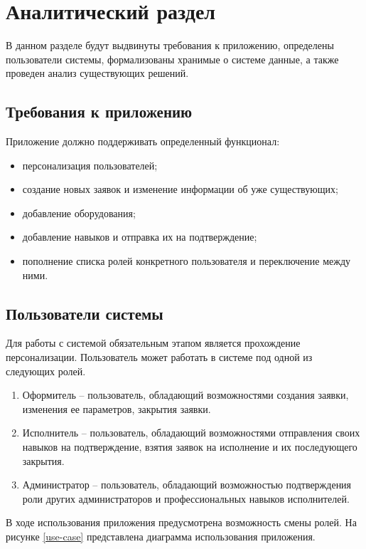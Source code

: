 \chapter{Аналитический раздел}

В данном разделе будут выдвинуты требования к приложению, определены пользователи системы, формализованы хранимые о системе данные, а также проведен анализ существующих решений.

\section{Требования к приложению}

Приложение должно поддерживать определенный функционал:
\begin{itemize}
	\item персонализация пользователей;
	\item создание новых заявок и изменение информации об уже существующих;
	\item добавление оборудования;
	\item добавление навыков и отправка их на подтверждение;
	\item пополнение списка ролей конкретного пользователя и переключение между ними.
\end{itemize}

\section{Пользователи системы}

Для работы с системой обязательным этапом является прохождение персонализации. Пользователь может работать в системе под одной из следующих ролей.
\begin{enumerate}
	\item Оформитель -- пользователь, обладающий возможностями создания заявки, изменения ее параметров, закрытия заявки.
	\item Исполнитель -- пользователь, обладающий возможностями отправления своих навыков на подтверждение, взятия заявок на исполнение и их последующего закрытия.
	\item Администратор -- пользователь, обладающий возможностью подтверждения роли других администраторов и профессиональных навыков исполнителей.
\end{enumerate}
В ходе использования приложения предусмотрена возможность смены ролей.
На рисунке \ref{use-case} представлена диаграмма использования приложения.

